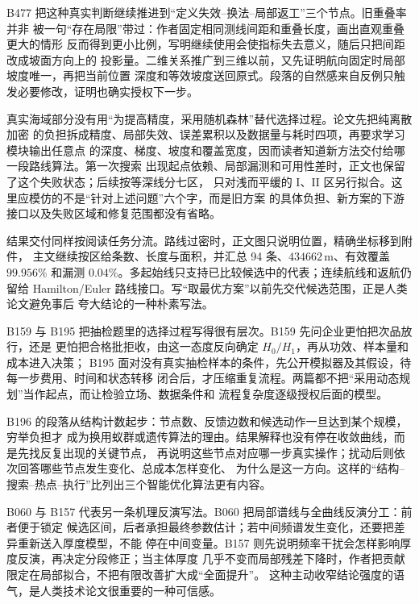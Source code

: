B477 把这种真实判断继续推进到“定义失效--换法--局部返工”三个节点。旧重叠率并非
被一句“存在局限”带过：作者固定相同测线间距和重叠长度，画出直观重叠更大的情形
反而得到更小比例，写明继续使用会使指标失去意义，随后只把间距改成坡面方向上的
投影量。二维关系推广到三维以前，又先证明航向固定时局部坡度唯一，再把当前位置
深度和等效坡度送回原式。段落的自然感来自反例只触发必要修改，证明也确实授权下一步。

真实海域部分没有用“为提高精度，采用随机森林”替代选择过程。论文先把纯离散加密
的负担拆成精度、局部失效、误差累积以及数据量与耗时四项，再要求学习模块输出任意点
的深度、梯度、坡度和覆盖宽度，因而读者知道新方法交付给哪一段路线算法。第一次搜索
出现起点依赖、局部漏测和可用性差时，正文也保留了这个失败状态；后续按等深线分七区，
只对浅而平缓的 I、II 区另行拟合。这里应模仿的不是“针对上述问题”六个字，而是旧方案
的具体负担、新方案的下游接口以及失败区域和修复范围都没有省略。

结果交付同样按阅读任务分流。路线过密时，正文图只说明位置，精确坐标移到附件，
主文继续按区给条数、长度与面积，并汇总 94 条、$434662\,\mathrm{m}$、有效覆盖
$99.956\%$ 和漏测 $0.04\%$。多起始线只支持已比较候选中的代表；连续航线和返航仍留给
Hamilton/Euler 路线接口。写“取最优方案”以前先交代候选范围，正是人类论文避免事后
夸大结论的一种朴素写法。

B159 与 B195 把抽检题里的选择过程写得很有层次。B159 先问企业更怕把次品放行，还是
更怕把合格批拒收，由这一态度反向确定 $H_0/H_1$，再从功效、样本量和成本进入决策；
B195 面对没有真实抽检样本的条件，先公开模拟器及其假设，待每一步费用、时间和状态转移
闭合后，才压缩重复流程。两篇都不把“采用动态规划”当作起点，而让检验立场、数据条件和
流程复杂度逐级授权后面的模型。

B196 的段落从结构计数起步：节点数、反馈边数和候选动作一旦达到某个规模，穷举负担才
成为换用蚁群或遗传算法的理由。结果解释也没有停在收敛曲线，而是先找反复出现的关键节点，
再说明这些节点对应哪一步真实操作；扰动后则依次回答哪些节点发生变化、总成本怎样变化、
为什么是这一方向。这样的“结构--搜索--热点--执行”比列出三个智能优化算法更有内容。

B060 与 B157 代表另一条机理反演写法。B060 把局部谱线与全曲线反演分工：前者便于锁定
候选区间，后者承担最终参数估计；若中间频谱发生变化，还要把差异重新送入厚度模型，不能
停在中间变量。B157 则先说明频率干扰会怎样影响厚度反演，再决定分段修正；当主体厚度
几乎不变而局部残差下降时，作者把贡献限定在局部拟合，不把有限改善扩大成“全面提升”。
这种主动收窄结论强度的语气，是人类技术论文很重要的一种可信感。

